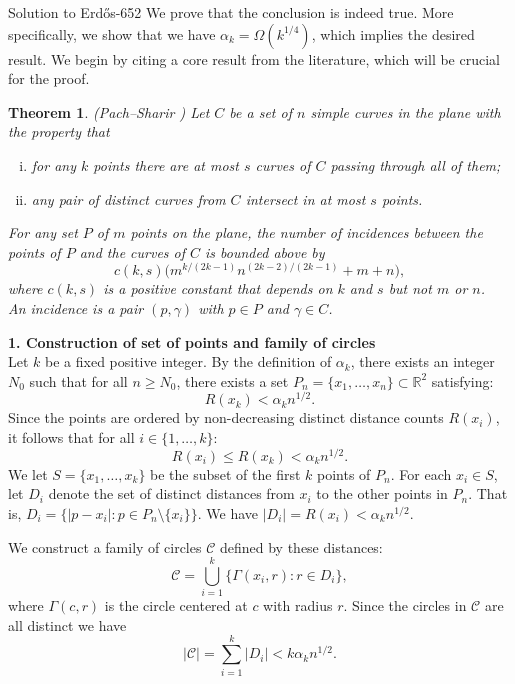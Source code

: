 \documentclass{article}
\theoremstyle{plain}
\newtheorem{theorem}{Theorem}
\theoremstyle{definition}
\begin{document}
\begin{solution}{Solution to {Erdős-652}}
We prove that the conclusion is indeed true. More specifically, we show that we have $\alpha_k = \Omega(k^{1/4})$, which implies the desired result. We begin by citing a core result from the literature, which will be crucial for the proof.

\begin{theorem}(Pach--Sharir \cite[Theorem 1.1]{PS98}) \label{thm : Pach-Sharir incidence bound}
Let $C$ be a set of $n$ simple curves in the plane with the property that
\begin{enumerate}[(i)]
    \item for any $k$ points there are at most $s$ curves of $C$ passing through all of them;
    \item any pair of distinct curves from $C$ intersect in at most $s$ points.
\end{enumerate}
For any set $P$ of $m$ points on the plane, the number of incidences between the points of $P$ and the curves of $C$ is bounded above by
\[c(k,s)\bigl(m^{k/(2k-1)}n^{(2k-2)/(2k-1)}+m+n\bigr),\]
where $c(k,s)$ is a positive constant that depends on $k$ and $s$ but not $m$ or $n$.\\
An incidence is a pair $(p,\gamma)$ with $p\in P$ and $\gamma\in C$.
\end{theorem} 
\textbf{1. Construction of set of points and family of circles} \\
Let $k$ be a fixed positive integer. By the definition of $\alpha_k$, there exists an integer $N_0$ such that for all $n \geq N_0$, there exists a set $P_n = \{x_1, \ldots, x_n\} \subset \mathbb{R}^2$ satisfying:
\[ R(x_k) < \alpha_k n^{1/2}. \]
Since the points are ordered by non-decreasing distinct distance counts $R(x_i)$, it follows that for all $i \in \{1, \ldots, k\}$:
\[ R(x_i) \leq R(x_k) < \alpha_k n^{1/2}. \]
We let  $S = \{x_1, \ldots, x_k\}$ be the subset of the first $k$ points of $P_n$. For each $x_i \in S$, let $D_i$ denote the set of distinct distances from $x_i$ to the other points in $P_n$. That is, $D_i = \{ |p - x_i| : p \in P_n \setminus \{x_i\} \}$. We have $|D_i| = R(x_i) < \alpha_{k} n^{1/2}$.

We construct a family of circles $\mathcal{C}$ defined by these distances:
\[ \mathcal{C} = \bigcup_{i=1}^k \{ \Gamma(x_i, r) : r \in D_i \}, \]
where $\Gamma(c, r)$ is the circle centered at $c$ with radius $r$. Since the circles in $\mathcal{C}$ are all distinct we have
\[ |\mathcal{C}| = \sum_{i=1}^k |D_i| < k \alpha_{k} n^{1/2}. \]


\end{solution}
\end{document}

